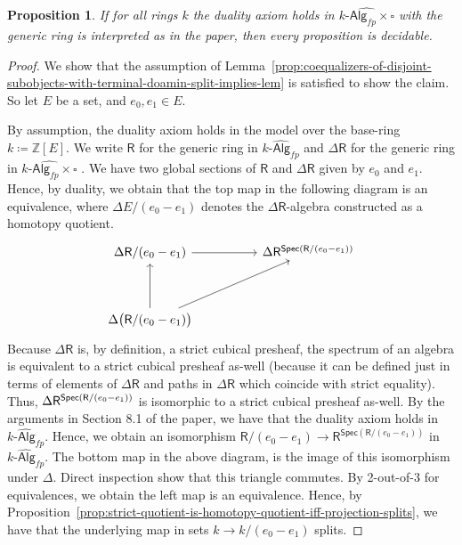 \documentclass[10pt,a4paper]{article}
\newtheorem{proposition}{Proposition}[section]
\newcommand{\ints}{\mathbb{Z}}
\newcommand{\Alg}{\mathsf{Alg}}
\DeclarePairedDelimiter\paren{(}{)}
\newcommand\R{\mathsf{R}}
\newcommand\Spec{\mathsf{Spec}}
\begin{document}
\begin{proposition}\label{prop:strict-duality-implies-lem}
  If for all rings \(k\) the duality axiom holds in \(\widehat{k\text{-}\Alg_{fp} \times \square}\) with the generic ring is interpreted as in the paper, then every proposition is decidable.
\end{proposition}
\begin{proof}
  We show that the assumption of Lemma~\ref{prop:coequalizers-of-disjoint-subobjects-with-terminal-doamin-split-implies-lem} is satisfied to show the claim.
  So let $E$ be a set, and $e_0, e_1 \in E$.

  By assumption, the duality axiom holds in the model over the base-ring $k \coloneqq \ints[E]$.
  We write $\R$ for the generic ring in $\widehat{k\textsf{-Alg}_{fp}}$ and $\Delta\R$ for the generic ring in $\widehat{k\textsf{-Alg}_{fp} \times \square}$ .
  We have two global sections of $\R$ and $\Delta \R$ given by $e_0$ and $e_1$.
  Hence, by duality, we obtain that the top map in the following diagram is an equivalence, where $\Delta E/(e_0 - e_1)$ denotes the $\Delta\R$-algebra constructed as a homotopy quotient.
  \[\begin{tikzcd}
    \Delta\R/(e_0 - e_1) \arrow[rr]                &  & \Delta\R^{\Spec\paren{\R/(e_0 - e_1)}} \\
                                                   &  &                                  \\
    \Delta\paren[\big]{\R/(e_0 - e_1)} \arrow[rruu] \arrow[uu] &  &                                 
  \end{tikzcd}\]
  Because $\Delta\R$ is, by definition, a strict cubical presheaf, the spectrum of an algebra is equivalent to a strict cubical presheaf as-well (because it can be defined just in terms of elements of $\Delta \R$ and paths in $\Delta \R$ which coincide with strict equality).
  Thus, $\Delta\R^{\Spec\paren{\R/(e_0 - e_1)}}$ is isomorphic to a strict cubical presheaf as-well.
  By the arguments in Section 8.1 of the paper, we have that the duality axiom holds in $\widehat{k\textsf{-Alg}_{fp}}$.
  Hence, we obtain an isomorphism $\R/(e_0 - e_1) \to \R^{\Spec(\R / (e_0 - e_1))}$ in $\widehat{k\textsf{-Alg}_{fp}}$.
  The bottom map in the above diagram, is the image of this isomorphism under \(\Delta\).
  Direct inspection show that this triangle commutes.
  By 2-out-of-3 for equivalences, we obtain the left map is an equivalence.
  Hence, by Proposition~\ref{prop:strict-quotient-is-homotopy-quotient-iff-projection-splits}, we have that the underlying map in sets $k \to k/(e_0 - e_1)$ splits. 


\end{proof}
\end{document}
